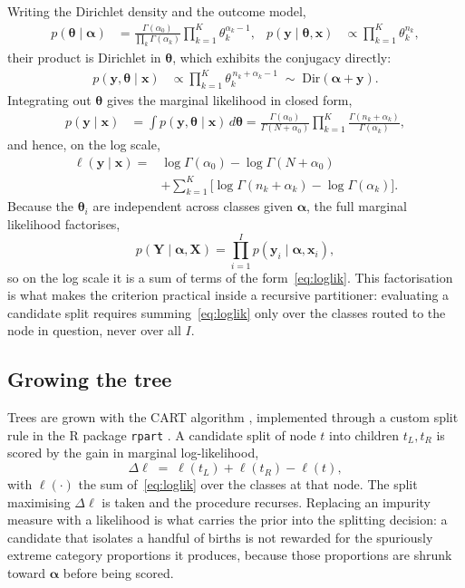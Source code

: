 Writing the Dirichlet density and the outcome model,
\begin{align*}
  p(\boldsymbol{\theta}\mid\boldsymbol{\alpha})
    &= \frac{\Gamma(\alpha_0)}{\prod_{k}\Gamma(\alpha_k)}
       \prod_{k=1}^{K}\theta_k^{\alpha_k-1},
  &
  p(\mathbf{y}\mid\boldsymbol{\theta},\mathbf{x})
    &\propto \prod_{k=1}^{K}\theta_k^{n_k},
\end{align*}
their product is Dirichlet in $\boldsymbol{\theta}$, which exhibits the
conjugacy directly:
\begin{align*}
  p(\mathbf{y},\boldsymbol{\theta}\mid\mathbf{x})
    &\propto \prod_{k=1}^{K}\theta_k^{\,n_k+\alpha_k-1}
     \;\sim\; \mathrm{Dir}(\boldsymbol{\alpha}+\mathbf{y}).
\end{align*}
Integrating out $\boldsymbol{\theta}$ gives the marginal likelihood in closed
form,
\begin{align*}
  p(\mathbf{y}\mid\mathbf{x})
    &= \int p(\mathbf{y},\boldsymbol{\theta}\mid\mathbf{x})\,
       d\boldsymbol{\theta}
     = \frac{\Gamma(\alpha_0)}{\Gamma(N+\alpha_0)}
       \prod_{k=1}^{K}\frac{\Gamma(n_k+\alpha_k)}{\Gamma(\alpha_k)},
\end{align*}
and hence, on the log scale,
\begin{equation}
\label{eq:loglik}
\begin{split}
  \ell(\mathbf{y}\mid\mathbf{x})
    ={}& \log\Gamma(\alpha_0)-\log\Gamma(N+\alpha_0)\\
       &+\sum_{k=1}^{K}\bigl[\log\Gamma(n_k+\alpha_k)-\log\Gamma(\alpha_k)\bigr].
\end{split}
\end{equation}
Because the $\boldsymbol{\theta}_i$ are independent across classes given
$\boldsymbol{\alpha}$, the full marginal likelihood factorises,
\[
  p(\mathbf{Y}\mid\boldsymbol{\alpha},\mathbf{X})
    = \prod_{i=1}^{I}p(\mathbf{y}_i\mid\boldsymbol{\alpha},\mathbf{x}_i),
\]
so on the log scale it is a sum of terms of the form~\eqref{eq:loglik}. This
factorisation is what makes the criterion practical inside a recursive
partitioner: evaluating a candidate split requires summing~\eqref{eq:loglik}
only over the classes routed to the node in question, never over all $I$.

\subsection{Growing the tree}

Trees are grown with the CART algorithm \citep{breiman1984classification},
implemented through a custom split rule in the R package \texttt{rpart}
\citep{rpart_docs}. A candidate split of node $t$ into children $t_L,t_R$ is
scored by the gain in marginal log-likelihood,
\[
  \Delta\ell \;=\; \ell(t_L)+\ell(t_R)-\ell(t),
\]
with $\ell(\cdot)$ the sum of~\eqref{eq:loglik} over the classes at that node.
The split maximising $\Delta\ell$ is taken and the procedure recurses. Replacing
an impurity measure with a likelihood is what carries the prior into the
splitting decision: a candidate that isolates a handful of births is not
rewarded for the spuriously extreme category proportions it produces, because
those proportions are shrunk toward $\boldsymbol{\alpha}$ before being scored.

